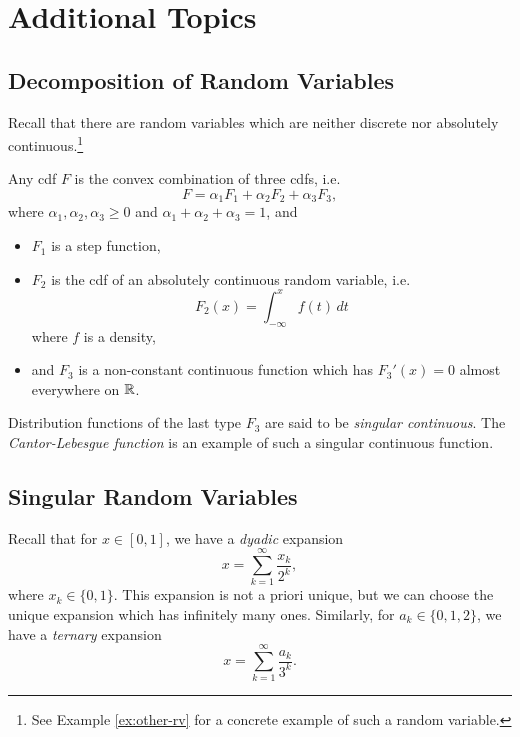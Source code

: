 \chapter{Additional Topics}

\section{Decomposition of Random Variables}
\begin{remark}
  Recall that there are random variables
  which are neither discrete nor absolutely
  continuous.\footnote{See Example \ref{ex:other-rv} for a concrete example of such a random variable.}
\end{remark}

\begin{theorem}
  Any cdf $F$ is the convex combination of
  three cdfs, i.e.
  \[
    F = \alpha_1 F_1 + \alpha_2 F_2 + \alpha_3 F_3,
  \]
  where $\alpha_1, \alpha_2, \alpha_3 \ge 0$
  and $\alpha_1 + \alpha_2 + \alpha_3 = 1$, and
  \begin{itemize}
    \item $F_1$ is a step function,
    \item $F_2$ is the cdf of an absolutely
      continuous random variable, i.e.
      \[
        F_2(x) = \int_{-\infty}^x f(t) \, dt
      \]
      where $f$ is a density,
    \item and $F_3$ is a non-constant continuous
      function which has $F_3'(x) = 0$ almost
      everywhere on $\mathbb{R}$.
  \end{itemize}
\end{theorem}

\begin{remark}
  Distribution functions of the last type $F_3$
  are said to be \emph{singular continuous}.
  The \emph{Cantor-Lebesgue function} is an example of
  such a singular continuous function.
\end{remark}

\section{Singular Random Variables}
Recall that for $x \in [0, 1]$, we have a
\emph{dyadic} expansion
\[
  x = \sum_{k = 1}^\infty \frac{x_k}{2^k},
\]
where $x_k \in \{0, 1\}$. This expansion is not
a priori unique, but we can choose the unique
expansion which has infinitely many ones.
Similarly, for $a_k \in \{0, 1, 2\}$, we have a
\emph{ternary} expansion
\[
  x = \sum_{k = 1}^\infty \frac{a_k}{3^k}.
\]

